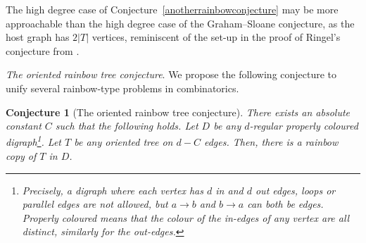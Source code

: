 \documentclass[a4paper,11pt,hidelinks]{amsart}
\newtheorem{conjecture}[theorem]{Conjecture}
\theoremstyle{definition}
\begin{document}
\par The high degree case of Conjecture~\ref{anotherrainbowconjecture} may be more approachable than the high degree case of the Graham--Sloane conjecture, as the host graph has $2|T|$ vertices, reminiscent of the set-up in the proof of Ringel's conjecture from \cite{ringel}.
\par \textit{The oriented rainbow tree conjecture}. We propose the following conjecture to unify several rainbow-type problems in combinatorics. 
\begin{conjecture}[The oriented rainbow tree conjecture]\label{conj:directedrainbow} There exists an absolute constant $C$ such that the following holds.
    Let $D$ be any $d$-regular properly coloured digraph\footnote{Precisely, a digraph where each vertex has $d$ in and $d$ out edges, loops or parallel edges are not allowed, but $a\to b$ and $b\to a$ can both be edges. Properly coloured means that the colour of the in-edges of any vertex are all distinct, similarly for the out-edges. }. Let $T$ be any oriented tree on $d-C$ edges. Then, there is a rainbow copy of $T$ in $D$. 
\end{conjecture}
\end{document}

